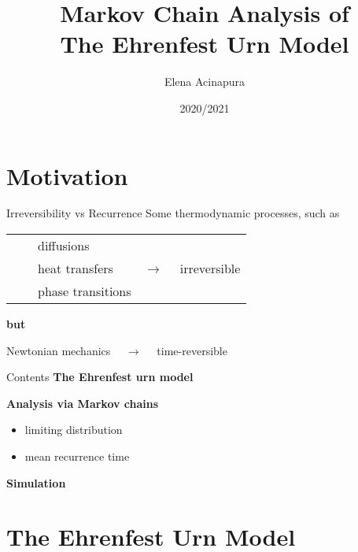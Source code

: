 \documentclass[usenames,dvipsnames]{beamer}
\title{Markov Chain Analysis of \\The Ehrenfest Urn Model}
\date{2020/2021}
\author{Elena Acinapura}
\institute{Università di Trento}
\newcommand{\tabitem}{~~\llap{\textbullet}~~}
\begin{document}
  \maketitle
  \section{Motivation}
  \begin{frame}{Irreversibility vs Recurrence}
    Some thermodynamic processes, such as 

    \begin{table}
        \begin{center}
        \begin{tabular}{l c}
            \tabitem diffusions & \\
            \tabitem heat transfers & $\rightarrow \quad $ \alert{irreversible}\\
            \tabitem phase transitions & 
        \end{tabular}
        \end{center}
    \end{table}
    
    \begin{center}
        \textbf{but}
    \end{center}
    
    \begin{center}
    Newtonian mechanics $\quad \rightarrow \quad$ \alert{time-reversible}
    \end{center}
  \end{frame}

  \begin{frame}{Contents}
    \textbf{The Ehrenfest urn model}

    \medskip
    \textbf{Analysis via Markov chains}
      \begin{itemize}
        \item limiting distribution
        \item mean recurrence time
      \end{itemize}
      \medskip
    \textbf{Simulation}
  \end{frame}

  \section{The Ehrenfest Urn Model}
  
\end{document}
